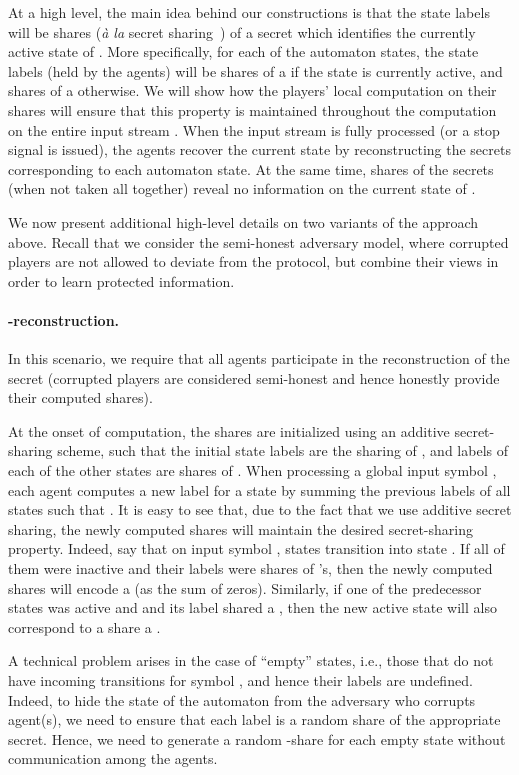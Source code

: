 \documentclass[letterpaper,11pt]{article}
\begin{document}
At a high level, the main idea behind our constructions is that the
state labels will be shares ({\em \`{a} la} secret
sharing~\cite{Sha79}) of a secret which identifies the currently
active state of .  More specifically, for each of the 
automaton states, the  state labels (held by the  agents) will
be shares of a  if the state is currently active, and shares of a
 otherwise.  We will show how the players' local computation on
their shares will ensure that this property is maintained throughout
the computation on the entire input stream .  When the input
stream  is fully processed (or a stop signal is issued), the
agents recover the current state by reconstructing the secrets
corresponding to each automaton state.  At the same time, shares of
the secrets (when not taken all together) reveal no information on the
current state of .


We now present additional high-level details on two variants of
the approach above. Recall that we consider the semi-honest adversary model, 
where corrupted players are not allowed to deviate from the protocol, but 
combine their views in order to learn protected information.

\vspace{-.1in}
\paragraph{-reconstruction.}  In this scenario, we require that all 
 agents participate in the reconstruction of the secret (corrupted
players are considered semi-honest and hence honestly provide their computed
shares).

At the onset of computation, the shares are initialized using an 
additive secret-sharing scheme, such that the initial state labels are the
sharing of , and labels of each of the other states are shares of .
When processing a global input symbol , each agent computes a
new label for a state  by summing the previous labels of all states
 such that .  It is easy to see that, due to the
fact that we use additive secret sharing, the newly computed shares
will maintain the desired
secret-sharing property.  Indeed, say that on input symbol
,  states transition into state .  If all of them
were inactive and their labels were shares of 's, then the newly computed 
shares 
will encode a  (as the sum of  zeros).  Similarly, if one of the 
predecessor states was active and and its label shared a , then  
the new active state  will also correspond to a share a .

A technical problem arises in the case of ``empty'' states, i.e.,
those that do not have incoming transitions for symbol , and
hence their labels are undefined. Indeed, to hide the state of the
automaton from the adversary who corrupts agent(s), we need to ensure that
each label is a random share of the appropriate secret.  Hence, we
need to generate a random -share for each empty state without
communication among the agents.
\end{document}
